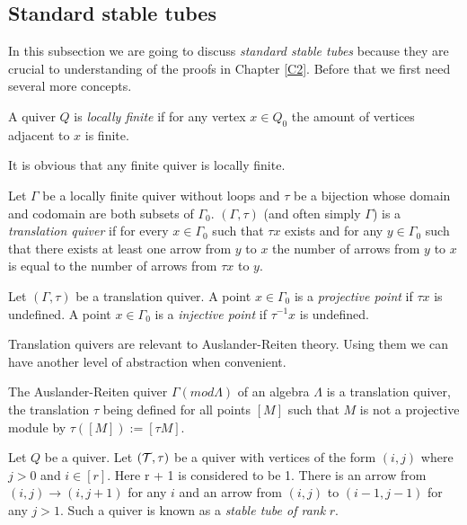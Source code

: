 \subsection{Standard stable tubes}
\indent In this subsection we are going to discuss \textit{standard stable tubes} because they are crucial to understanding of the proofs in Chapter \ref{C2}. Before that we first need several more concepts.\\
\begin{definition}
A quiver $Q$ is \textit{locally finite} if for any vertex $x\in Q_0$ the amount of vertices adjacent to $x$ is finite.
\end{definition}
\indent It is obvious that any finite quiver is locally finite.
\begin{definition}
\cite{ASS06} Let $\Gamma$ be a locally finite quiver without loops and $\tau$ be a bijection whose domain and codomain are both subsets of $\Gamma_0$. $(\Gamma,\tau)$ (and often simply $\Gamma$) is a \textit{translation quiver} if for every $x\in \Gamma_0$ such that $\tau x$ exists and for any $y\in\Gamma_0$ such that there exists at least one arrow from $y$ to $x$ the number of arrows from $y$ to $x$ is equal to the number of arrows from $\tau x$ to $y$.
\end{definition}
\begin{definition}
Let $(\Gamma, \tau)$ be a translation quiver. A point $x\in\Gamma_0$ is a \textit{projective point} if $\tau x$ is undefined. A point $x\in\Gamma_0$ is a \textit{injective point} if $\tau^{-1} x$ is undefined. 
\end{definition}
\indent Translation quivers are relevant to Auslander-Reiten theory. Using them we can have another level of abstraction when convenient.\\
\begin{lemma}
\cite{ASS06} The Auslander-Reiten quiver $\Gamma(mod \Lambda)$ of an algebra $\Lambda$ is a translation quiver, the translation $\tau$ being defined for all points $[M]$ such that $M$ is not a projective module by $\tau([M]):=[\tau M]$. 
\end{lemma}
\begin{definition}
Let $Q$ be a quiver. Let $(\mathcal{T},\tau)$ be a quiver with vertices of the form $(i,j)$ where $j > 0$ and $i\in [r]$. Here r + 1 is considered to be 1. There is an arrow from $(i,j)\to (i, j + 1)$ for any $i$ and an arrow from $(i,j)$ to $(i - 1, j - 1)$ for any $j>1$. Such a quiver is known as a \textit{stable tube of rank} $r$.
\end{definition}
